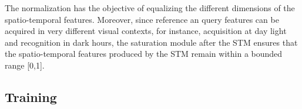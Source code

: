 \documentclass[letterpaper, 10 pt, conference]{ieeeconf}  %
\begin{document}
The normalization has the objective of equalizing the different dimensions of the
spatio-temporal features. Moreover, since reference an query features can be acquired
in very different visual contexts, for instance, acquisition at day light and recognition in
dark hours, the saturation module after the STM ensures that the spatio-temporal
features produced by the STM remain within a bounded range [0,1].




\subsection{Training}\label{sub:training}






\end{document}
